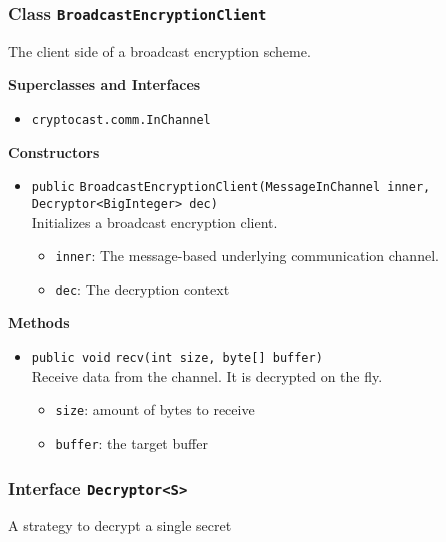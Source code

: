 \subsubsection{Class \lstinline|BroadcastEncryptionClient|}
The client side of a broadcast encryption scheme. \\



\textbf{Superclasses and Interfaces}
\begin{itemize}
\item \lstinline|cryptocast.comm.InChannel|
\end{itemize}



\textbf{Constructors}
\begin{itemize}
\item \lstinline|public| \lstinline|BroadcastEncryptionClient|\lstinline|(MessageInChannel inner, Decryptor<BigInteger> dec)|\\
Initializes a broadcast encryption client.
\begin{itemize}
\item \lstinline|inner|: The message-based underlying communication channel.
\item \lstinline|dec|: The decryption context
\end{itemize}



\end{itemize}


\textbf{Methods}
\begin{itemize}
\item \lstinline|public void| \lstinline|recv|\lstinline|(int size, byte[] buffer)|\\
Receive data from the channel. It is decrypted on the fly.
\begin{itemize}
\item \lstinline|size|: amount of bytes to receive
\item \lstinline|buffer|: the target buffer
\end{itemize}



\end{itemize}

\subsubsection{Interface \lstinline|Decryptor<S>|}
A strategy to decrypt a single secret \\



